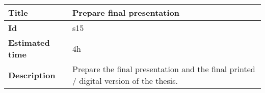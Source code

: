     \begin{tabular}{ | p{4cm} | p{10cm} |}
    \hline
    \textbf{Title} & Prepare final presentation\\ \hline
    \textbf{Id} & s15\\ \hline
    \textbf{Estimated time} & 4h \\ \hline
    \textbf{Description} &  Prepare the final presentation and the final printed / digital version of the thesis.  \\ 
    \hline
    \end{tabular} \\\\










